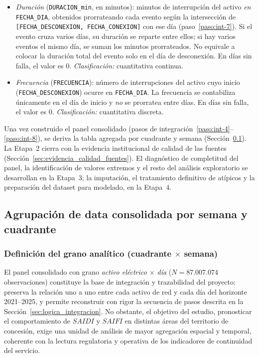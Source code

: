     \begin{itemize}
        \item \textit{Duración} (\texttt{DURACION\_min}, en minutos): minutos de interrupción del activo \textit{en} \texttt{FECHA\_DIA}, obtenidos prorrateando cada evento según la intersección de \texttt{[FECHA\_DESCONEXION, FECHA\_CONEXION]} con ese día (paso~\ref{paso:int-7}). Si el evento cruza varios días, su duración se reparte entre ellos; si hay varios eventos el mismo día, se suman los minutos prorrateados. No equivale a colocar la duración total del evento solo en el día de desconexión. En días sin falla, el valor es $0$. \textit{Clasificación:} cuantitativa continua.
    
        \item \textit{Frecuencia} (\texttt{FRECUENCIA}): número de interrupciones del activo cuyo inicio (\texttt{FECHA\_DESCONEXION}) ocurre en \texttt{FECHA\_DIA}. La frecuencia se contabiliza únicamente en el día de inicio y \textit{no} se prorratea entre días. En días sin falla, el valor es $0$. \textit{Clasificación:} cuantitativa discreta.
    \end{itemize}
    
    
    
    Una vez construido el panel consolidado (pasos de integración~\ref{paso:int-4}--\ref{paso:int-8}), se deriva la tabla agregada por cuadrante y semana (Sección~\ref{sec:agrupacion_cuadrante_semana}). La Etapa~2 cierra con la evidencia institucional de calidad de las fuentes (Sección~\ref{sec:evidencia_calidad_fuentes}). El diagnóstico de completitud del panel, la identificación de valores extremos y el resto del análisis exploratorio se desarrollan en la Etapa~3; la imputación, el tratamiento definitivo de atípicos y la preparación del dataset para modelado, en la Etapa~4.
    
    \subsection{Agrupación de data consolidada por semana y cuadrante}
    \label{sec:agrupacion_cuadrante_semana}
    
    \subsubsection{Definición del grano analítico (cuadrante $\times$ semana)}
    
    El panel consolidado con grano \textit{activo eléctrico $\times$ día} ($N = 87{.}007{.}074$ observaciones) constituye la base de integración y trazabilidad del proyecto: preserva la relación uno a uno entre cada activo de red y cada día del horizonte 2021--2025, y permite reconstruir con rigor la secuencia de pasos descrita en la Sección~\ref{sec:logica_integracion}. No obstante, el objetivo del estudio, pronosticar el comportamiento de $SAIDI$ y $SAIFI$ en distintas áreas del territorio de concesión, exige una unidad de análisis de mayor agregación espacial y temporal, coherente con la lectura regulatoria y operativa de los indicadores de continuidad del servicio.
    
